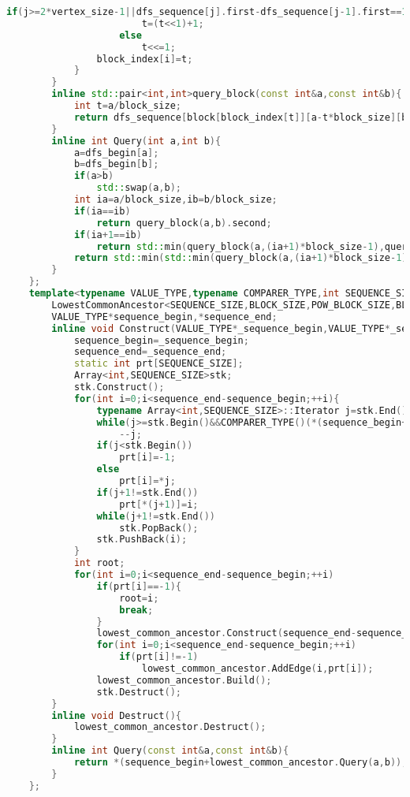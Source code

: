 \documentclass{book}
\begin{document}
\begin{lstlisting}[language=C++,title={Range Minimum Query.hpp (7403 bytes, 228 lines)}]
					if(j>=2*vertex_size-1||dfs_sequence[j].first-dfs_sequence[j-1].first==1)
						t=(t<<1)+1;
					else
						t<<=1;
				block_index[i]=t;
			}
		}
		inline std::pair<int,int>query_block(const int&a,const int&b){
			int t=a/block_size;
			return dfs_sequence[block[block_index[t]][a-t*block_size][b-t*block_size]+t*block_size];
		}
		inline int Query(int a,int b){
			a=dfs_begin[a];
			b=dfs_begin[b];
			if(a>b)
				std::swap(a,b);
			int ia=a/block_size,ib=b/block_size;
			if(ia==ib)
				return query_block(a,b).second;
			if(ia+1==ib)
				return std::min(query_block(a,(ia+1)*block_size-1),query_block(ib*block_size,b)).second;
			return std::min(std::min(query_block(a,(ia+1)*block_size-1),query_block(ib*block_size,b)),query_sparse_table(ia+1,ib-1)).second;
		}
	};
	template<typename VALUE_TYPE,typename COMPARER_TYPE,int SEQUENCE_SIZE,int BLOCK_SIZE,int POW_BLOCK_SIZE,int BLOCK_COUNT,int LG_BLOCK_COUNT>struct RangeMinimumQuery{
		LowestCommonAncestor<SEQUENCE_SIZE,BLOCK_SIZE,POW_BLOCK_SIZE,BLOCK_COUNT,LG_BLOCK_COUNT>lowest_common_ancestor;
		VALUE_TYPE*sequence_begin,*sequence_end;
		inline void Construct(VALUE_TYPE*_sequence_begin,VALUE_TYPE*_sequence_end){
			sequence_begin=_sequence_begin;
			sequence_end=_sequence_end;
			static int prt[SEQUENCE_SIZE];
			Array<int,SEQUENCE_SIZE>stk;
			stk.Construct();
			for(int i=0;i<sequence_end-sequence_begin;++i){
				typename Array<int,SEQUENCE_SIZE>::Iterator j=stk.End()-1;
				while(j>=stk.Begin()&&COMPARER_TYPE()(*(sequence_begin+i),*(sequence_begin+*j)))
					--j;
				if(j<stk.Begin())
					prt[i]=-1;
				else
					prt[i]=*j;
				if(j+1!=stk.End())
					prt[*(j+1)]=i;
				while(j+1!=stk.End())
					stk.PopBack();
				stk.PushBack(i);
			}
			int root;
			for(int i=0;i<sequence_end-sequence_begin;++i)
				if(prt[i]==-1){
					root=i;
					break;
				}
				lowest_common_ancestor.Construct(sequence_end-sequence_begin,root);
				for(int i=0;i<sequence_end-sequence_begin;++i)
					if(prt[i]!=-1)
						lowest_common_ancestor.AddEdge(i,prt[i]);
				lowest_common_ancestor.Build();
				stk.Destruct();
		}
		inline void Destruct(){
			lowest_common_ancestor.Destruct();
		}
		inline int Query(const int&a,const int&b){
			return *(sequence_begin+lowest_common_ancestor.Query(a,b));
		}
	};
\end{lstlisting}
\end{document}
